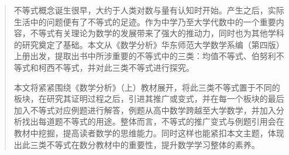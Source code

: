 \documentclass[oneside]{CCNUthesis}
\begin{document}



\frontmatter


\tableofcontents


\begin{abstract}
  不等式概念诞生很早，大约于人类对数与量有认知时开始。产生之后，实际生活中的问题便有了不等式的足迹。作为中学乃至大学代数中的一个重要内容，不等式有关理论为数学的发展带来了强大的推动力，同时也为其他学科的研究奠定了基础。本文从《数学分析》华东师范大学数学系编（第四版）上册出发，提取出书中所涉重要的不等式中的三类：均值不等式、伯努利不等式和柯西不等式，并对此三类不等式进行探究。

  本文将紧紧围绕《数学分析》（上）教材展开，将此三类不等式置于不同的板块，在研究其证明过程之后，引进其推广或变式，并在每一个板块的最后加入不等式对应例题进行解答，例题从高中数学跨越至大学数学，并加入分析找出每道题不等式的用途。整体而言，不等式的推广变式与例题引用会在教材中挖掘，提高读者数学的思维能力。同时这样也能紧扣本文主题，体现出此三类不等式在数分教材中的重要性，提升数学学习整体的素养。
\end{abstract}
\end{document}
